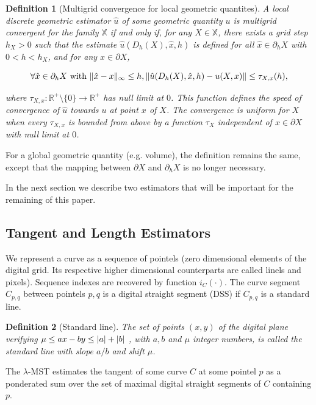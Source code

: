 \documentclass[runningheads]{llncs}
\newtheorem{ddef}{Definition}
\DeclarePairedDelimiter\norm{\lVert}{\rVert}%
\DeclarePairedDelimiter\abs{\lvert}{\rvert}%
\begin{document}
	\begin{ddef}[Multigrid convergence for local geometric quantites]
		A local discrete geometric estimator $\hat{u}$ of some geometric quantity $u$ is multigrid convergent for the family $\mathbb{X}$ if and only if, for any $X \in \mathbb{X}$, there exists a grid step $h_X>0$ such that the estimate $\hat{u}(D_h(X),\hat{x},h)$ is defined for all $\hat{x} \in \partial_hX$ with $ 0 < h < h_X$, and for any $x \in \partial X$,
		
		\begin{equation}
			\forall \hat{x} \in  \partial_hX \text{ with } \norm{ \hat{x} - x }_{\infty} \leq h, \norm{ \hat{u}(D_h(X),\hat{x},h) - u(X,x)} \leq \tau_{X,x}(h),			
		\end{equation}
		
		where $\tau_{X,x}:\mathbb{R}^{+}\setminus\{0\} \rightarrow \mathbb{R}^{+}$ has null limit at $0$. This function defines the speed of convergence of $\hat{u}$ towards $u$ at point $x$ of $X$. The convergence is uniform for $X$ when every $\tau_{X,x}$ is bounded from above by a function $\tau_X$ independent of $x \in \partial X$ with null limit at $0$.
	\end{ddef}
	
	
	For a global geometric quantity (e.g. volume), the definition remains the same, except that the mapping between $\partial X$ and $\partial_h X$ is no longer necessary.
	
In the next section we describe two estimators that will be important for the remaining of this paper.

\subsection{Tangent and Length Estimators}
We represent a curve as a sequence of pointels (zero dimensional elements of the digital grid. Its respective higher dimensional counterparts are called linels and pixels). Sequence indexes are recovered by function $i_C(\cdot)$. The curve segment $C_{p,q}$ between pointels $p,q$ is a digital straight segment (DSS) if $C_{p,q}$ is a standard line.


\begin{ddef}[Standard line] 
The set of points
$(x, y)$ of the digital plane verifying $\mu \leq ax -by \leq \abs{a} + \abs{b}$ , with $a,b$ and $\mu$
integer numbers, is called the standard line
with slope $a/b$ and shift $\mu$.
\end{ddef}

The $\lambda$-MST estimates the tangent of some curve $C$ at some pointel $p$ as a ponderated sum over the set of maximal digital straight segments of $C$ containing $p$.
\end{document}
